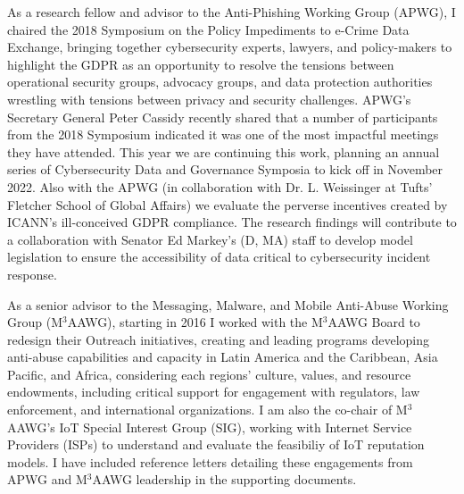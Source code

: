\documentclass[11pt]{letter}
\begin{document}
\begin{letter}
%
%
As a research fellow and advisor to the Anti-Phishing Working Group (APWG), I chaired the 2018 Symposium on the Policy Impediments to e-Crime Data Exchange, bringing together cybersecurity experts,
lawyers, and policy-makers to highlight the GDPR as an opportunity to resolve the tensions between operational security groups, advocacy groups, and data protection authorities wrestling with tensions between privacy and security challenges.
%
APWG's Secretary General Peter Cassidy recently shared that a number of participants from the 2018 Symposium indicated it was one of the most impactful meetings they have attended.
%
This year we are continuing this work, planning an annual series of Cybersecurity Data and Governance Symposia to kick off in November 2022.
%
Also with the APWG (in collaboration with Dr. L. Weissinger at Tufts' Fletcher School of Global Affairs) we evaluate the perverse incentives created by ICANN's ill-conceived GDPR compliance.
%
The research findings will contribute to a collaboration with Senator Ed Markey's (D, MA) staff to develop model legislation to ensure the accessibility of data critical to cybersecurity incident response. 

%
As a senior advisor to the Messaging, Malware, and Mobile Anti-Abuse Working Group (M$^3$AAWG), starting in 2016 I worked with the M$^3$AAWG Board to redesign their Outreach initiatives, creating and leading 
programs developing anti-abuse capabilities and capacity in Latin America and the Caribbean, Asia Pacific, and Africa, considering each regions' culture, values, and resource endowments, including critical support for engagement with regulators, law enforcement, and international organizations.
%
I am also the co-chair of M$^3$AAWG's IoT Special Interest Group (SIG), working with Internet Service Providers (ISPs) to understand and evaluate the feasibiliy of IoT reputation models.
%
I have included reference letters detailing these engagements from APWG and M$^3$AAWG leadership in the supporting documents.


\end{letter}
\end{document}
